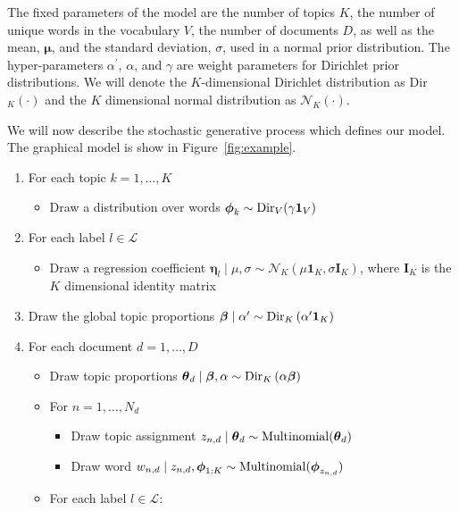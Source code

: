 The fixed parameters of the model are the number of topics $K$, the
number of unique words in the vocabulary $V$, the number of documents
$D$, as well as the mean, $\boldsymbol\mu$, and the standard deviation, $\sigma$,
used in a normal prior distribution. The hyper-parameters $\alpha^{\prime}$,
$\alpha$, and $\gamma$ are weight parameters for Dirichlet prior
distributions. We will denote the $K$-dimensional Dirichlet distribution
as Dir$_{K}(\cdot)$ and the $K$ dimensional normal distribution
as $\mathcal{N}_{K}(\cdot)$.

We will now describe the stochastic generative process which defines
our model. The graphical model is show in Figure~\ref{fig:example}.

\begin{enumerate}
\item For each topic $k=1,\ldots,K$

\begin{itemize}
\item Draw a distribution over words $\boldsymbol\phi_{k}\sim{\rm Dir}_{V}(\gamma\mathbf{1}_V)$%
\end{itemize}
\item For each label $l\in\mathcal{L}$

\begin{itemize}
\item Draw a regression coefficient $\boldsymbol\eta_{l}\mid\mu,\sigma\sim\mathcal{N}_{K}(\mu \mathbf{1}_K,\sigma \mathbf{I}_{K})$,
where $\mathbf{I}_{K}$ is the $K$ dimensional identity matrix 
\end{itemize}
\item Draw the global topic proportions $\boldsymbol\beta\mid\alpha'\sim{\rm Dir}_{K}\left(\alpha^{\prime}\mathbf{1}_K\right)$
\item For each document $d=1,\ldots,D$

\begin{itemize}
\item Draw topic proportions $\boldsymbol\theta_d\mid\boldsymbol\beta,\alpha\sim{\rm Dir}_{K}\left(\alpha\boldsymbol\beta\right)$ 
\item For $n=1,\ldots,N_{d}$

\begin{itemize}
\item Draw topic assignment $z_{n,d}\mid\boldsymbol\theta_d\sim{\rm Multinomial}(\boldsymbol\theta_d)$ 
\item Draw word $w_{n,d}\mid z_{n,d},\boldsymbol\phi_{1:K}\sim{\rm Multinomial}(\boldsymbol\phi_{z_{n,d}})$ 
\end{itemize}
\item For each label $l\in\mathcal{L}$: 


\end{itemize}
\end{enumerate}
